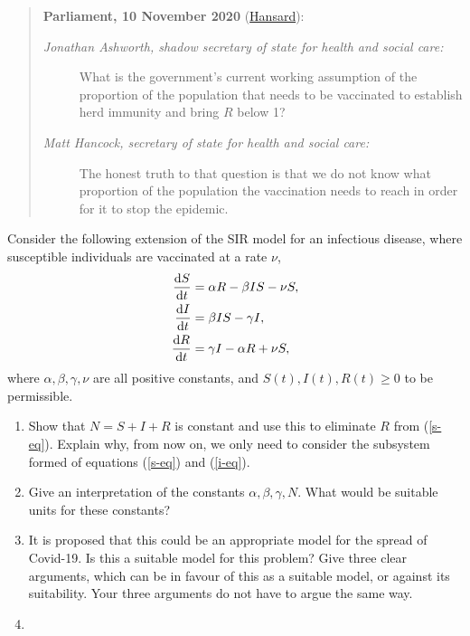 \documentclass[a4paper,12pt]{article}
\begin{document}
\begin{enumerate}[label={\bf \arabic{*}.\;}, ref={\arabic{*}},itemsep=3ex, left=0ex]
{}
\newpage
{}
{
\begin{quote}
  \textbf{Parliament, 10 November 2020} (\href{https://hansard.parliament.uk/Commons/2020-11-10/debates/FB5296EC-628D-4C17-9C28-4863AC8C07C9/Covid-19Update}{Hansard}):
  \vspace{-0.1cm}
  \begin{description}
    \item[\rm\itshape Jonathan Ashworth, shadow secretary of state for health and social care:]What is the government’s current working assumption of the proportion of the population that needs to be vaccinated to establish herd immunity and bring $R$ below 1?
    \item[\rm\itshape Matt Hancock, secretary of state for health and social care:] The honest truth to that question is that we do not know what proportion of the population the vaccination needs to reach in order for it to stop the epidemic.
  \end{description}
\end{quote}
Consider the following extension of the SIR model for an infectious disease, where susceptible individuals are vaccinated at a rate $\nu$,
\begin{align}
\fd{S}{t} &=\alpha R - \beta I S - \nu S, \label{s-eq}\\
\fd{I}{t} &= \beta I S - \gamma I, \label{i-eq}\\
\fd{R}{t} &= \gamma I - \alpha R + \nu S,\nonumber
\end{align}
where $\alpha,\beta,\gamma,\nu$ are all positive constants, and $S(t),I(t),R(t)\geq 0$ to be permissible.
\begin{enumerate}
	\item Show that $N=S+I+R$ is constant and use this to eliminate $R$ from (\ref{s-eq}). Explain why, from now on, we only need to consider the subsystem formed of equations (\ref{s-eq}) and (\ref{i-eq}).
	\item Give an interpretation of the constants $\alpha,\beta,\gamma,N$. What would be suitable units for these constants?	
	\item It is proposed that this could be an appropriate model for the spread of Covid-19. Is this a suitable model for this problem? Give three clear arguments, which can be in favour of this as a suitable model, or against its suitability. Your three arguments do not have to argue the same way. %
	\item 
	\begin{enumerate}[label=(\roman*)]

\end{enumerate}
\end{enumerate}}
\end{enumerate}
\end{document}
